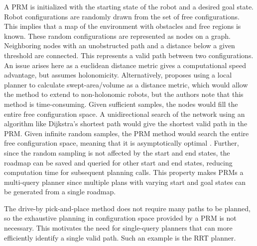 \documentclass[11pt]{article}
\begin{document}
            A PRM is initialized with the starting state of the robot and a desired goal state. Robot configurations are randomly drawn from the set of free configurations. This implies that a map of the environment with obstacles and free regions is known. These random configurations are represented as nodes on a graph. Neighboring nodes with an unobstructed path and a distance below a given threshold are connected. This represents a valid path between two configurations. An issue arises here as a euclidean distance metric gives a computational speed advantage, but assumes holonomicity. Alternatively, \cite{kavraki_probabilistic_1996} proposes using a local planner to calculate swept-area/volume as a distance metric, which would allow the method to extend to non-holonomic robots, but the authors note that this method is time-consuming. Given sufficient samples, the nodes would fill the entire free configuration space. A unidirectional search of the network using an algorithm like Dijkstra's shortest path would give the shortest valid path in the PRM. Given infinite random samples, the PRM method would search the entire free configuration space, meaning that it is asymptotically optimal \cite{newman_c18_2017}. Further, since the random sampling is not affected by the start and end states, the roadmap can be saved and queried for other start and end states, reducing computation time for subsequent planning calls. This property makes PRMs a multi-query planner since multiple plans with varying start and goal states can be generated from a single roadmap. 
            \par The drive-by pick-and-place method does not require many paths to be planned, so the exhaustive planning in configuration space provided by a PRM is not necessary. This motivates the need for single-query planners that can more efficiently identify a single valid path. Such an example is the RRT planner.
\end{document}

